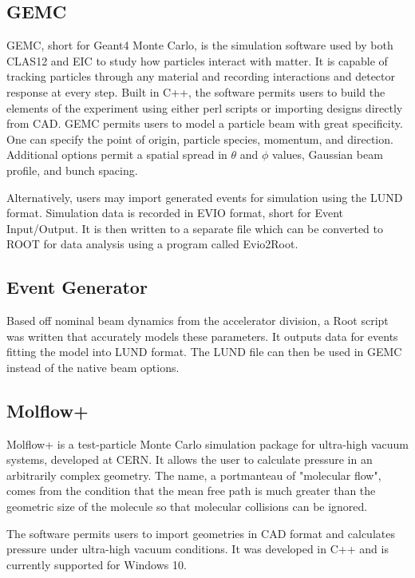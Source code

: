 \subsection{GEMC}

GEMC, short for Geant4 Monte Carlo, is the simulation software used by both CLAS12 and EIC to study how particles interact with matter.  It is capable of tracking particles through any material and recording interactions and detector response at every step.  Built in C++, the software permits users to build the elements of the experiment using either perl scripts or importing designs directly from CAD.  GEMC permits users to model a particle beam with great specificity.  One can specify the point of origin, particle species, momentum, and direction.  Additional options permit a spatial spread in $\theta$ and $\phi$ values, Gaussian beam profile, and bunch spacing. 

Alternatively, users may import generated events for simulation using the LUND format.  Simulation data is recorded in EVIO format, short for Event Input/Output.  It is then written to a separate file which can be converted to ROOT for data analysis using a program called Evio2Root.

\subsection{Event Generator}
Based off nominal beam dynamics from the accelerator division, a Root script was written that accurately models these parameters.  It outputs data for events fitting the model into LUND format.  The LUND file can then be used  in GEMC instead of the native beam options.  
  

\subsection{Molflow+}

Molflow+ is a test-particle Monte Carlo simulation package for ultra-high vacuum systems, developed at CERN.  It allows the user to calculate pressure in an arbitrarily complex geometry.  The name, a portmanteau of "molecular flow", comes from the condition that the mean free path is much greater than the geometric size of the molecule so that molecular collisions can be ignored.

The software permits users to import geometries in CAD format and calculates pressure under ultra-high vacuum conditions. It was developed in C++ and is currently supported for Windows 10.

